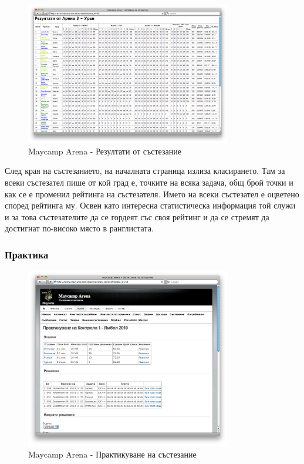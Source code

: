 \documentclass[a4paper,12pt]{article}
\begin{document}
  \begin{figure}[ht]
    \begin{center}
      \includegraphics[width=0.8\textwidth]{images/maycamp_arena_results.png}
    \end{center}
    \caption{Maycamp Arena - Резултати от състезание}
    \label{arena_results}
  \end{figure}
  
  След края на състезанието, на началната страница излиза класирането. Там за всеки състезател пише от кой град е, точките на всяка задача, общ брой точки и как се е променил рейтинга на състезателя. Името на всеки състезател е оцветено според рейтинга му. Освен като интересна статистическа информация той служи и за това състезателите да се гордеят със своя рейтинг и да се стремят да достигнат по-високо място в ранглистата.
  
  \pagebreak

  \subsubsection{Практика}

  \begin{figure}[ht]
    \begin{center}
      \includegraphics[width=0.8\textwidth]{images/maycamp_arena_practice.png}
    \end{center}
    \caption{Maycamp Arena - Практикуване на състезание}
    \label{arena_practice}
  \end{figure}
  
\end{document}
